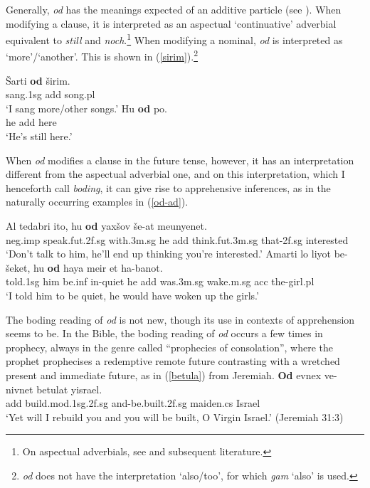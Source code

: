 \documentclass[output=paper,colorlinks,citecolor=brown]{langscibook}
\begin{document}
Generally, \textit{od} has the meanings expected of an additive particle (see \citealt{greenberg12}). When modifying a clause, it is interpreted as an aspectual `continuative' adverbial equivalent to  \textit{still} and  \textit{noch}.\footnote{On aspectual adverbials, see \citet{lobner89} and subsequent literature.} When modifying a nominal, \textit{od} is interpreted as `more'/`another'.  This is shown in (\ref{sirim}).\footnote{ \textit{od} does not have the interpretation `also/too', for which \textit{gam} `also' is used.} 

\ea
\label{sirim}
\begin{xlist}
\ex
\gll \v{S}arti \textbf{od} širim. \\
sang.1sg {\sc add} song.{\sc pl} \\
\glt  `I sang more/other songs.'
\ex
\gll Hu \textbf{od} po. \\
he {\sc add} here \\
\glt `He's still here.'
\end{xlist}
\z 

When \textit{od} modifies a clause in the future tense, however, it has an interpretation different from the aspectual adverbial one, and on this interpretation, which I henceforth call \textit{boding}, it can give rise to apprehensive inferences, as in the naturally occurring examples in (\ref{od-ad}).
\ea
\label{od-ad}
\begin{xlist}
\ex 
\gll  Al tedabri ito, hu \textbf{od} yaxšov še-at meunyenet. \\
{\sc neg.imp} speak.{\sc fut.2f.sg} with.{\sc 3m.sg} he {\sc add}  think.{\sc fut.3m.sg} that-{\sc 2f.sg} interested \\
\glt  `Don't talk to him, he'll end up thinking you're interested.'
\ex 
\gll  Amarti lo liyot be-šeket, hu \textbf{od} haya meir et ha-banot. \\
told.{\sc 1sg} him be.{\sc inf} in-quiet he {\sc add} was.{\sc 3m.sg} wake.{\sc m.sg} {\sc acc} the-girl.{\sc pl} \\
\glt  `I told him to be quiet, he would have woken up the girls.'
\end{xlist}
\z

The boding reading of \textit{od} is not new, though its use in contexts of apprehension seems to be. In the  Bible, the boding reading of \textit{od} occurs a few times in prophecy, always in the genre called ``prophecies of consolation'', where the prophet prophecises a redemptive remote future contrasting with a wretched present and immediate future, as in (\ref{betula}) from Jeremiah.
\ea
\label{betula}
\gll \textbf{Od} evnex ve-nivnet betulat yisrael.\\
 {\sc add} build.{\sc mod.1sg.2f.sg} and-be.built.{\sc 2f.sg} maiden.{\sc cs} Israel \\
\glt  `Yet will I rebuild you and you will be built, O Virgin Israel.' (Jeremiah 31:3)
\z
\end{document}
